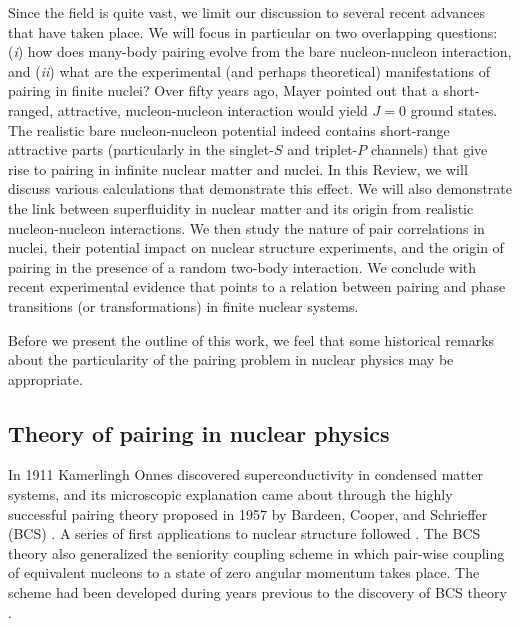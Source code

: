 \documentclass[rmp,preprint,aps,floatfix]{revtex4}
\begin{document}
Since the field
is quite vast, we limit our discussion to several recent 
advances that have taken place. We will
focus in particular on two overlapping questions: ({\it i}) how does
many-body pairing evolve from the bare nucleon-nucleon interaction, and
({\it ii}) what are the experimental (and perhaps theoretical) manifestations
of pairing in finite nuclei?  
Over fifty years ago, 
Mayer \cite{mayer_50} pointed out 
that a short-ranged, attractive, nucleon-nucleon interaction would 
yield $J=0$ ground states. The realistic bare nucleon-nucleon 
potential indeed contains short-range attractive 
parts (particularly in the singlet-$S$ and triplet-$P$ channels)
that give rise to pairing in infinite nuclear matter and nuclei. 
In this Review, we will
discuss various calculations that demonstrate this effect. We will
also demonstrate the link between superfluidity in nuclear matter
and its origin from realistic nucleon-nucleon interactions.
We then study the nature of pair correlations
in nuclei, their potential impact on nuclear structure
experiments, and the origin of pairing
in the presence of a random two-body interaction.
We conclude with recent experimental evidence that 
points to a relation between pairing and 
phase transitions (or transformations) in finite nuclear 
systems. 

Before we present the outline of this work, we feel that
some historical remarks about the particularity of the pairing 
problem in nuclear physics may be appropriate.

\subsection{Theory of pairing in nuclear physics}

In 1911 Kamerlingh Onnes discovered superconductivity in
condensed matter systems, and its microscopic explanation came 
about through the highly successful pairing theory proposed 
in 1957 by Bardeen, Cooper, and Schrieffer (BCS) 
\cite{bcs_theory}. A series of first applications to nuclear
structure followed \cite{bmp_58,belyaev_59,migdal_59}. 
The BCS theory also generalized
the seniority coupling scheme in which pair-wise coupling of 
equivalent nucleons to a state of zero angular momentum 
takes place. The scheme had been developed during
years previous to the discovery of BCS theory 
\cite{racah_42,mayer_50,racah_53}. 
\end{document}
